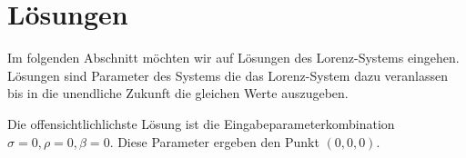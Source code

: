 \documentclass[loesungen.tex]{subfiles}
\begin{document}
	\section{Lösungen} %
	Im folgenden Abschnitt möchten wir auf Lösungen des Lorenz-Systems eingehen. Lösungen sind Parameter des Systems die das Lorenz-System dazu veranlassen bis in die unendliche Zukunft die gleichen Werte auszugeben.
	
	Die offensichtlichlichste Lösung ist die Eingabeparameterkombination $ \sigma = 0, \rho = 0, \beta = 0 $. Diese Parameter ergeben den Punkt $ (0, 0, 0) $.
	
\end{document}
